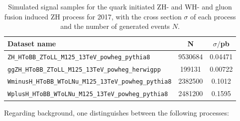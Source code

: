 \begin{table}[h!]
	\centering
	\begin{tabular}{lS[table-format=8.0]S[table-format=1.6]}
		Dataset name&{N}&$\sigma/$\si{\pico\barn} \\
		\midrule
		\verb|ZH_HToBB_ZToLL_M125_13TeV_powheg_pythia8|&9530684 &0.04471\\
		\verb|ggZH_HToBB_ZToLL_M125_13TeV_powheg_herwigpp|& 199131&0.00722\\
		\midrule
		\verb|WminusH_HToBB_WToLNu_M125_13TeV_powheg_pythia8|&2382500&0.1012\\
		\verb|WplusH_HToBB_WToLNu_M125_13TeV_powheg_pythia8|&2481200&0.1595\\
	\end{tabular}
	\caption{Simulated signal samples for the quark initiated ZH- and WH- and gluon fusion induced ZH process for 2017, with the cross section $\sigma$ of each process and the number of generated events $N$.}
	\label{tab:signal_datasets}
\end{table}

Regarding background, one distinguishes between the following processes:

